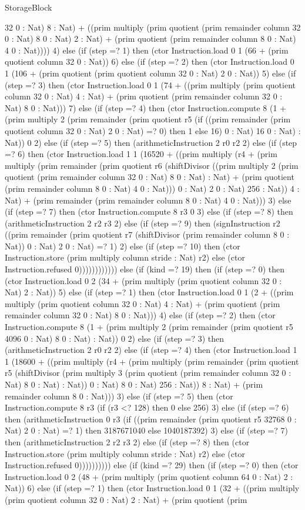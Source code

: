 \begin{lexlean}{StorageBlock}
\begin{semanticmodule}
{32 0 : Nat) 8 : Nat) + ((prim multiply (prim quotient (prim remainder column 32 0 : Nat) 8 0 : Nat) 2 : Nat) + (prim quotient (prim remainder column 8 0 : Nat) 4 0 : Nat)))) 4) else (if (step =? 1) then (ctor Instruction.load 0 1 (66 + (prim quotient column 32 0 : Nat)) 6) else (if (step =? 2) then (ctor Instruction.load 0 1 (106 + (prim quotient (prim quotient column 32 0 : Nat) 2 0 : Nat)) 5) else (if (step =? 3) then (ctor Instruction.load 0 1 (74 + ((prim multiply (prim quotient column 32 0 : Nat) 4 : Nat) + (prim quotient (prim remainder column 32 0 : Nat) 8 0 : Nat))) 7) else (if (step =? 4) then (ctor Instruction.compute 8 (1 + (prim multiply 2 (prim remainder (prim quotient r5 (if ((prim remainder (prim quotient column 32 0 : Nat) 2 0 : Nat) =? 0) then 1 else 16) 0 : Nat) 16 0 : Nat) : Nat)) 0 2) else (if (step =? 5) then (arithmeticInstruction 2 r0 r2 2) else (if (step =? 6) then (ctor Instruction.load 1 1 (16520 + ((prim multiply (r4 + (prim multiply (prim remainder (prim quotient r6 (shiftDivisor ((prim multiply 2 (prim quotient (prim remainder column 32 0 : Nat) 8 0 : Nat) : Nat) + (prim quotient (prim remainder column 8 0 : Nat) 4 0 : Nat))) 0 : Nat) 2 0 : Nat) 256 : Nat)) 4 : Nat) + (prim remainder (prim remainder column 8 0 : Nat) 4 0 : Nat))) 3) else (if (step =? 7) then (ctor Instruction.compute 8 r3 0 3) else (if (step =? 8) then (arithmeticInstruction 2 r2 r3 2) else (if (step =? 9) then (signInstruction r2 ((prim remainder (prim quotient r7 (shiftDivisor (prim remainder column 8 0 : Nat)) 0 : Nat) 2 0 : Nat) =? 1) 2) else (if (step =? 10) then (ctor Instruction.store (prim multiply column stride : Nat) r2) else (ctor Instruction.refused 0)))))))))))) else (if (kind =? 19) then (if (step =? 0) then (ctor Instruction.load 0 2 (34 + (prim multiply (prim quotient column 32 0 : Nat) 2 : Nat)) 5) else (if (step =? 1) then (ctor Instruction.load 0 1 (2 + ((prim multiply (prim quotient column 32 0 : Nat) 4 : Nat) + (prim quotient (prim remainder column 32 0 : Nat) 8 0 : Nat))) 4) else (if (step =? 2) then (ctor Instruction.compute 8 (1 + (prim multiply 2 (prim remainder (prim quotient r5 4096 0 : Nat) 8 0 : Nat) : Nat)) 0 2) else (if (step =? 3) then (arithmeticInstruction 2 r0 r2 2) else (if (step =? 4) then (ctor Instruction.load 1 1 (18600 + ((prim multiply (r4 + (prim multiply (prim remainder (prim quotient r5 (shiftDivisor (prim multiply 3 (prim quotient (prim remainder column 32 0 : Nat) 8 0 : Nat) : Nat)) 0 : Nat) 8 0 : Nat) 256 : Nat)) 8 : Nat) + (prim remainder column 8 0 : Nat))) 3) else (if (step =? 5) then (ctor Instruction.compute 8 r3 (if (r3 <? 128) then 0 else 256) 3) else (if (step =? 6) then (arithmeticInstruction 0 r3 (if ((prim remainder (prim quotient r5 32768 0 : Nat) 2 0 : Nat) =? 1) then 3187671040 else 1040187392) 3) else (if (step =? 7) then (arithmeticInstruction 2 r2 r3 2) else (if (step =? 8) then (ctor Instruction.store (prim multiply column stride : Nat) r2) else (ctor Instruction.refused 0)))))))))) else (if (kind =? 29) then (if (step =? 0) then (ctor Instruction.load 0 2 (48 + (prim multiply (prim quotient column 64 0 : Nat) 2 : Nat)) 6) else (if (step =? 1) then (ctor Instruction.load 0 1 (32 + ((prim multiply (prim quotient column 32 0 : Nat) 2 : Nat) + (prim quotient (prim }
\end{semanticmodule}
\end{lexlean}
